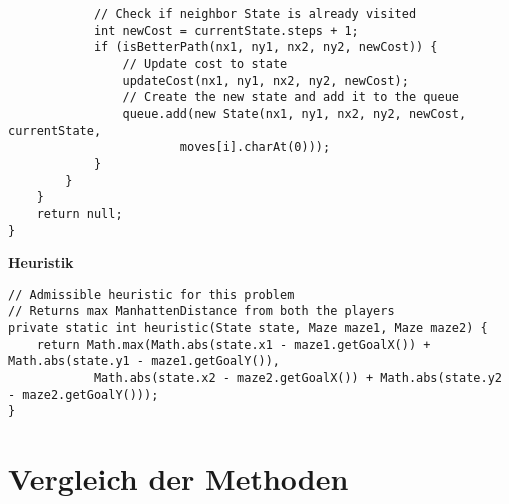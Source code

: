 \documentclass[a4paper,10pt,ngerman]{scrartcl}
\begin{document}
\begin{lstlisting}
            // Check if neighbor State is already visited
            int newCost = currentState.steps + 1;
            if (isBetterPath(nx1, ny1, nx2, ny2, newCost)) {
                // Update cost to state
                updateCost(nx1, ny1, nx2, ny2, newCost);
                // Create the new state and add it to the queue
                queue.add(new State(nx1, ny1, nx2, ny2, newCost, currentState,
                        moves[i].charAt(0)));
            }
        }
    }
    return null;
}
\end{lstlisting}
\textbf{Heuristik}
\begin{lstlisting}
// Admissible heuristic for this problem 
// Returns max ManhattenDistance from both the players
private static int heuristic(State state, Maze maze1, Maze maze2) {
    return Math.max(Math.abs(state.x1 - maze1.getGoalX()) + Math.abs(state.y1 - maze1.getGoalY()),
            Math.abs(state.x2 - maze2.getGoalX()) + Math.abs(state.y2 - maze2.getGoalY()));
}
\end{lstlisting}
\section{Vergleich der Methoden}
\end{document}
